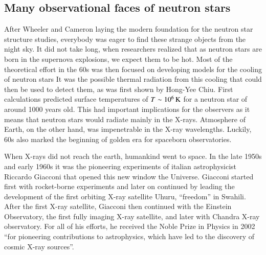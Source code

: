\subsection{Many observational faces of neutron stars}

After Wheeler and Cameron laying the modern foundation for the neutron star structure studies, everybody was eager to find these strange objects from the night sky.
It did not take long, when researchers realized that as neutron stars are born in the supernova explosions, we expect them to be hot.
Most of the theoretical effort in the 60s was then focused on developing models for the cooling of neutron stars\cite{Stabler60, Chiu64, Morton64, CS64, BW65a, BW65b, TC66}
It was the possible thermal radiation from this cooling that could then be used to detect them, as was first shown by Hong-Yee Chiu\cite{Chiu64}.
First calculations predicted surface temperatures of $T \sim 10^6 \, \mathrm{K}$ for a neutron star of around 1000 years old.
This had important implications for the observers as it means that neutron stars would radiate mainly in the X-rays.
Atmosphere of Earth, on the other hand, was impenetrable in the X-ray wavelengths.
Luckily, 60s also marked the beginning of golden era for spaceborn observatories.

When X-rays did not reach the earth, humankind went to space.
In the late 1950s and early 1960s it was the pioneering experiments of italian astrophysicist Riccardo Giacconi that opened this new window the Universe.
Giacconi started first with rocket-borne experiments and later on continued by leading the development of the first orbiting X-ray satellite Uhuru, ``freedom'' in Swahili.\cite{GGP62}
After the first X-ray satellite, Giacconi then continued with the Einstein Observatory, the first fully imaging X-ray satellite, and later with Chandra X-ray observatory.
For all of his efforts, he received the Noble Prize in Physics in 2002 ``for pioneering contributions to astrophysics, which have led to the discovery of cosmic X-ray sources''.

